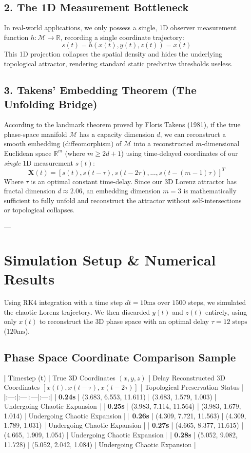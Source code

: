 \documentclass[11pt,twocolumn]{article}
\begin{document}
{\subsection{2. The 1D Measurement Bottleneck}
In real-world applications, we only possess a single, 1D observer measurement function $h: \mathcal{M} \to \mathbb{R}$, recording a single coordinate trajectory:
$$s(t) = h(x(t), y(t), z(t)) = x(t)$$
This 1D projection collapses the spatial density and hides the underlying topological attractor, rendering standard static predictive thresholds useless.

\subsection{3. Takens' Embedding Theorem (The Unfolding Bridge)}
According to the landmark theorem proved by Floris Takens (1981), if the true phase-space manifold $\mathcal{M}$ has a capacity dimension $d$, we can reconstruct a smooth embedding (diffeomorphism) of $\mathcal{M}$ into a reconstructed $m$-dimensional Euclidean space $\mathbb{R}^m$ (where $m \ge 2d + 1$) using time-delayed coordinates of our \textit{single} 1D measurement $s(t)$:
$$\mathbf{X}(t) = \left[ s(t), s(t - \tau), s(t - 2\tau), \dots, s(t - (m-1)\tau) \right]^T$$
Where $\tau$ is an optimal constant time-delay. Since our 3D Lorenz attractor has fractal dimension $d \approx 2.06$, an embedding dimension $m = 3$ is mathematically sufficient to fully unfold and reconstruct the attractor without self-intersections or topological collapses.

---

\section{Simulation Setup & Numerical Results}

Using RK4 integration with a time step $dt = 10\text{ms}$ over $1500$ steps, we simulated the chaotic Lorenz trajectory. We then discarded $y(t)$ and $z(t)$ entirely, using only $x(t)$ to reconstruct the 3D phase space with an optimal delay $\tau = 12\text{ steps}$ ($120\text{ms}$).

\subsection{Phase Space Coordinate Comparison Sample}

| Timestep (t) | True 3D Coordinates $(x, y, z)$ | Delay Reconstructed 3D Coordinates $[x(t), x(t-\tau), x(t-2\tau)]$ | Topological Preservation Status |
|:---:|:---|:---|:---:|
| \textbf{0.24s} | (3.683, 6.553, 11.611) | (3.683, 1.579, 1.003) | Undergoing Chaotic Expansion |
| \textbf{0.25s} | (3.983, 7.114, 11.564) | (3.983, 1.679, 1.014) | Undergoing Chaotic Expansion |
| \textbf{0.26s} | (4.309, 7.721, 11.563) | (4.309, 1.789, 1.031) | Undergoing Chaotic Expansion |
| \textbf{0.27s} | (4.665, 8.377, 11.615) | (4.665, 1.909, 1.054) | Undergoing Chaotic Expansion |
| \textbf{0.28s} | (5.052, 9.082, 11.728) | (5.052, 2.042, 1.084) | Undergoing Chaotic Expansion |

}
\end{document}
